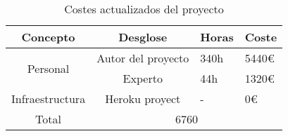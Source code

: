 \begin{longtable}{|c|c|l|l|}
  \caption{Costes actualizados del proyecto}
  \label{tab:costes actualizados del proyecto}

  \endfirsthead
  \endhead

  \hline
  Concepto & Desglose & Horas & Coste \\ \hline
  \multirow{2}{*}{Personal} & Autor del proyecto & 340h & 5440€ \\ \cline{2-4}
  & Experto & 44h & 1320€ \\ \hline
  Infraestructura & Heroku proyect & - & 0€ \\ \hline
  Total & \multicolumn{3}{c|}{6760} \\ \hline

\end{longtable}
